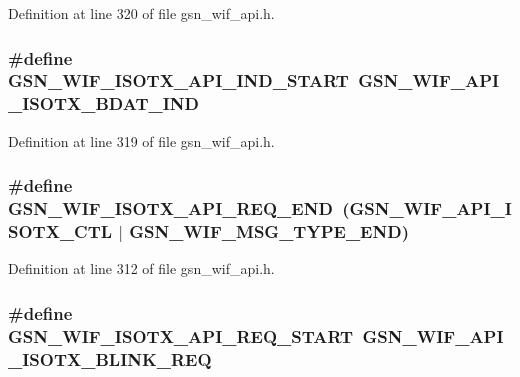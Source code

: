 Definition at line 320 of file gsn\_\-wif\_\-api.h.

\hypertarget{a00606_ac00a78bc5243ffae41de840e417dbbe8}{
\subsubsection[{GSN\_\-WIF\_\-ISOTX\_\-API\_\-IND\_\-START}]{\setlength{\rightskip}{0pt plus 5cm}\#define GSN\_\-WIF\_\-ISOTX\_\-API\_\-IND\_\-START~GSN\_\-WIF\_\-API\_\-ISOTX\_\-BDAT\_\-IND}}
\label{a00606_ac00a78bc5243ffae41de840e417dbbe8}


Definition at line 319 of file gsn\_\-wif\_\-api.h.

\hypertarget{a00606_a2b181291892e88fc4edb7a8cfca27942}{
\subsubsection[{GSN\_\-WIF\_\-ISOTX\_\-API\_\-REQ\_\-END}]{\setlength{\rightskip}{0pt plus 5cm}\#define GSN\_\-WIF\_\-ISOTX\_\-API\_\-REQ\_\-END~(GSN\_\-WIF\_\-API\_\-ISOTX\_\-CTL $|$ GSN\_\-WIF\_\-MSG\_\-TYPE\_\-END)}}
\label{a00606_a2b181291892e88fc4edb7a8cfca27942}


Definition at line 312 of file gsn\_\-wif\_\-api.h.

\hypertarget{a00606_a2466920f393b1d4118b179abbbd22304}{
\subsubsection[{GSN\_\-WIF\_\-ISOTX\_\-API\_\-REQ\_\-START}]{\setlength{\rightskip}{0pt plus 5cm}\#define GSN\_\-WIF\_\-ISOTX\_\-API\_\-REQ\_\-START~GSN\_\-WIF\_\-API\_\-ISOTX\_\-BLINK\_\-REQ}}
\label{a00606_a2466920f393b1d4118b179abbbd22304}



